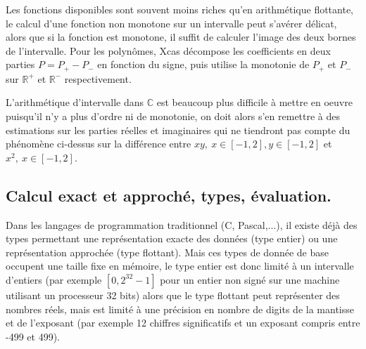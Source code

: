 \documentclass[a4paper,11pt]{article}
\newcommand{\R}{{\mathbb{R}}}
\newcommand{\C}{{\mathbb{C}}}
\begin{document}
\begin{giacjshere}
Les fonctions disponibles sont souvent moins riches qu'en
arithm\'etique flottante, le calcul d'une fonction non monotone
sur un intervalle peut s'av\'erer d\'elicat, alors que si la fonction
est monotone, il suffit de calculer l'image des deux bornes
de l'intervalle. Pour les polyn\^omes, Xcas d\'ecompose
les coefficients en deux parties $P=P_+-P_-$ en fonction
du signe, puis utilise la monotonie de $P_+$ et $P_-$ sur
$\R^+$ et $\R^-$ respectivement.

L'arithm\'etique d'intervalle dans $\C$ est beaucoup plus difficile
\`a mettre en oeuvre puisqu'il n'y a plus d'ordre ni de monotonie,
on doit alors s'en remettre \`a des estimations sur les parties
r\'eelles et imaginaires qui ne tiendront pas compte du ph\'enom\`ene
ci-dessus sur la diff\'erence entre $xy, \ x \in [-1,2], y \in [-1,2]$
et $x^2, \ x \in [-1,2]$.

\subsection{Calcul exact et approché, types, évaluation.}
Dans les langages de programmation traditionnel (C, Pascal,...), il existe 
déjà des types permettant une représentation 
exacte des données (type entier) ou une représentation approchée 
(type flottant). Mais ces types de donnée de base 
occupent une taille fixe en mémoire, le type entier est donc
limité à un intervalle d'entiers (par exemple $[0,2^{32}-1]$ pour un entier
non signé sur une machine utilisant un processeur 32 bits) alors que le 
type flottant peut représenter des nombres réels, mais est 
limité à une précision en nombre de digits de la mantisse et de l'exposant 
(par exemple 12 chiffres significatifs et un 
exposant compris entre -499 et 499). 


\end{giacjshere}
\end{document}
